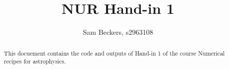 \documentclass[a4paper,10pt]{article}
\title{NUR Hand-in 1}
\author{Sam Beckers, s2963108}
\begin{document}
\maketitle

\begin{abstract}
 This docuement contains the code and outputs of Hand-in 1 of the  
 course Numerical recipes for astrophysics.
\end{abstract}




\end{document}
